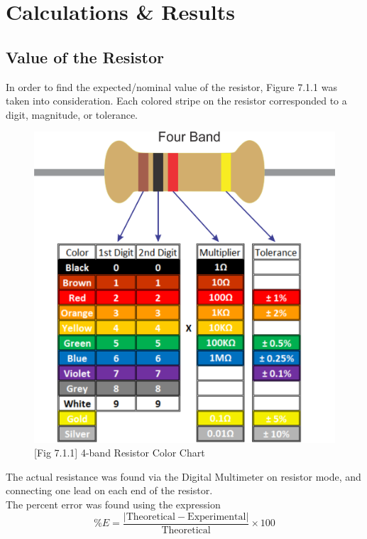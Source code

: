 \documentclass[titlepage]{article}
\begin{document}
    \section{Calculations \& Results}

        \subsection{Value of the Resistor} 
		In order to find the expected/nominal value of the resistor, Figure 7.1.1 was taken into consideration. Each colored stripe on the resistor corresponded to a digit, magnitude, or tolerance. 
		\begin{center}
		\begin{figure}[h!]
			\caption*{[Fig 7.1.1] 4-band Resistor Color Chart}
			\centering
                \includegraphics[scale=0.17]{results/band-code.jpg}
	\end{figure}
	\end{center}
The actual resistance was found via the Digital Multimeter on resistor mode, and connecting one lead on each end of the resistor. \\
\vspace{0.5cm}
The percent error was found using the expression
\[\%E = \frac{|\text{Theoretical} - \text{Experimental}|}{\text{Theoretical}} \times 100\]
\end{document}
